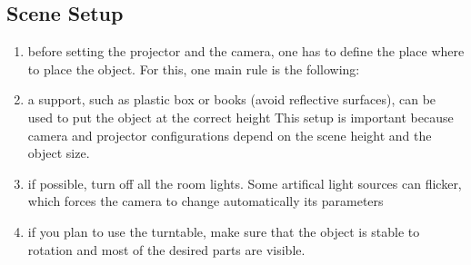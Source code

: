 \documentclass[11pt]{article}
\begin{document}
\subsection{Scene Setup}
\begin{enumerate}
\item before setting the projector and the camera, one has to define the place where to place the object.
For this, one main rule is the following: 

\noindent
{}

\item a support, such as plastic box or books (avoid reflective surfaces), can be used to put the object at the correct height
This setup is important because camera and projector configurations depend on the scene height and the object size.
\item if possible, turn off all the room lights. Some artifical light sources can flicker, which forces the camera to change automatically its parameters
\item if you plan to use the turntable, make sure that the object is stable to rotation and most of the desired parts are visible.
\end{enumerate}
\end{document}
